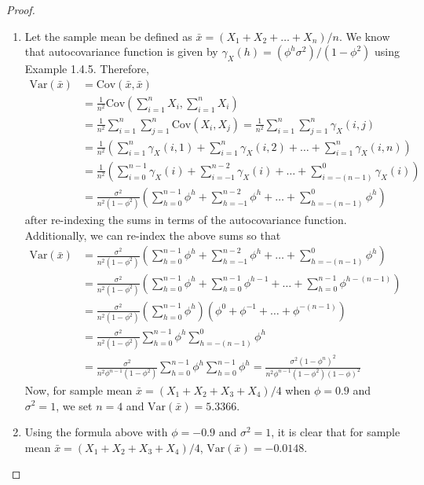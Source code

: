 \documentclass[12pt]{article}
\theoremstyle{definition}
\newcommand{\V}{\text{Var}}
\newcommand{\Co}[2]{\text{Cov}({#1}, {#2})}
\begin{document}
\begin{proof}
  \begin{enumerate}
    \item Let the sample mean be defined as $\bar{x} = (X_1 + X_2 + \dots + X_n) / n$.
      We know that autocovariance function is given by
      $\gamma_X(h) = (\phi ^ h \sigma^2) / (1 - \phi^2)$ using Example 1.4.5.
      Therefore,
      \begin{align*}
        \V(\bar{x}) &= \Co{\bar{x}}{\bar{x}} \\
        &= \frac{1}{n^2}\text{Cov}\left(\sum_{i=1}^n X_i, \sum_{i=1}^n X_i\right) \\
        &= \frac{1}{n^2}\sum_{i=1}^n\sum_{j=1}^n\Co{X_i}{X_j} = \frac{1}{n^2}\sum_{i=1}^n\sum_{j=1}^n \gamma_X(i,j) \\
        &= \frac{1}{n^2}\left(\sum_{i=1}^n \gamma_X(i,1) + \sum_{i=1}^n \gamma_X(i,2) + \dots + \sum_{i=1}^n \gamma_X(i,n)\right)  \\
        &= \frac{1}{n^2}\left(\sum_{i=0}^{n-1} \gamma_X(i) + \sum_{i=-1}^{n-2} \gamma_X(i) + \dots + \sum_{i=-(n-1)}^0 \gamma_X(i)\right)  \\
        &= \frac{\sigma^2}{n^2(1-\phi^2)}\left(\sum_{h=0}^{n-1} \phi ^ h + \sum_{h=-1}^{n-2} \phi^h + \dots + \sum_{h=-(n-1)}^0 \phi^h\right)
      \end{align*}
      after re-indexing the sums in terms of the autocovariance function. Additionally,
      we can re-index the above sums so that
      \begin{align*}
        \V(\bar{x}) &= \frac{\sigma^2}{n^2(1-\phi^2)}\left(\sum_{h=0}^{n-1} \phi ^ h + \sum_{h=-1}^{n-2} \phi^h + \dots + \sum_{h=-(n-1)}^0 \phi^h\right) \\
        &= \frac{\sigma^2}{n^2(1-\phi^2)}\left(\sum_{h=0}^{n-1} \phi ^ h + \sum_{h=0}^{n-1} \phi^{h-1} + \dots + \sum_{h=0}^{n-1} \phi^{h-(n-1)}\right) \\
        &= \frac{\sigma^2}{n^2(1-\phi^2)}\left(\sum_{h=0}^{n-1} \phi ^ h\right) \left(\phi^0 + \phi^{-1} + \dots + \phi^{-(n-1)}\right)\\
        &= \frac{\sigma^2}{n^2(1-\phi^2)}\sum_{h=0}^{n-1} \phi ^ h \sum_{h=-(n-1)}^{0} \phi ^ h\\
        &= \frac{\sigma^2}{n^2\phi^{n-1}(1-\phi^2)} \sum_{h=0}^{n-1} \phi ^ h\sum_{h=0}^{n-1} \phi ^ h
        = \frac{\sigma^2(1-\phi^n)^2}{n^2\phi^{n-1}(1-\phi^2)(1-\phi)^2}
      \end{align*}
      Now, for sample mean $\bar{x} = (X_1 + X_2 + X_3 + X_4) / 4$
      when $\phi = 0.9$ and $\sigma^2 = 1$, we set $n=4$ and $\V(\bar{x}) = 5.3366$.
    \item Using the formula above with $\phi = -0.9$ and $\sigma^2 = 1$, it is
      clear that for sample mean $\bar{x} = (X_1 + X_2 + X_3 + X_4) / 4$, $\V(\bar{x}) = -0.0148$.
  \end{enumerate}
\end{proof}
\end{document}
